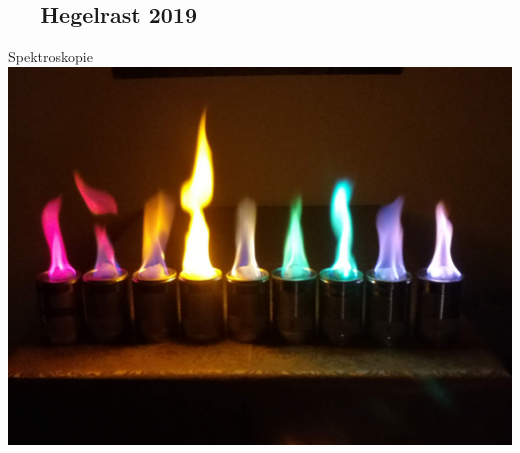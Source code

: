 \subsection{\ccbysa ~~ Hegelrast 2019 }
\begin{frame}{Spektroskopie} \centering
    \includegraphics[width=.9\textwidth]{Figures Lecture on Hadrons/Spectrosopy.jpg}
\end{frame}
\subsection{}

   

